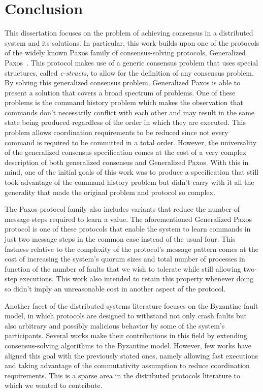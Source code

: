 \chapter{Conclusion} \label{conclusion}
This dissertation focuses on the problem of achieving consensus in a distributed system and its solutions. In particular, this work builds upon one of the protocols of the widely known Paxos family of consensus-solving protocols, Generalized Paxos~\cite{Lamport2005}. This protocol makes use of a generic consensus problem that uses special structures, called \textit{c-structs}, to allow for the definition of any consensus problem. By solving this generalized consensus problem, Generalized Paxos is able to present a solution that covers a broad spectrum of problems. One of these problems is the command history problem which makes the observation that commands don't necessarily conflict with each other and may result in the same state being produced regardless of the order in which they are executed. This problem allows coordination requirements to be reduced since not every command is required to be committed in a total order. However, the universality of the generalized consensus specification comes at the cost of a very complex description of both generalized consensus and Generalized Paxos. With this in mind, one of the initial goals of this work was to produce a specification that still took advantage of the command history problem but didn't carry with it all the generality that made the original problem and protocol so complex. \par
The Paxos protocol family also includes variants that reduce the number of message steps required to learn a value. The aforementioned Generalized Paxos protocol is one of these protocols that enable the system to learn commands in just two message steps in the common case instead of the usual four. This fastness relative to the complexity of the protocol's message pattern comes at the cost of increasing the system's quorum sizes and total number of processes in function of the number of faults that we wish to tolerate while still allowing two-step executions. This work also intended to retain this property whenever doing so didn't imply an unreasonable cost in another aspect of the protocol. \par
Another facet of the distributed systems literature focuses on the Byzantine fault model, in which protocols are designed to withstand not only crash faults but also arbitrary and possibly malicious behavior by some of the system's participants. Several works make their contributions in this field by extending consensus-solving algorithms to the Byzantine model. However, few works have aligned this goal with the previously stated ones, namely allowing fast executions and taking advantage of the commutativity assumption to reduce coordination requirements. This is a sparse area in the distributed protocols literature to which we wanted to contribute.\par
